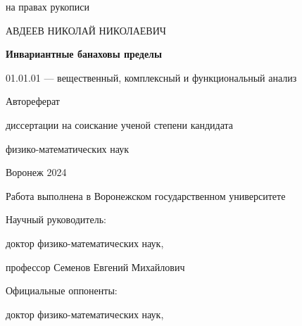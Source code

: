 \documentclass[12pt]{article}
\begin{document}
\large

\thispagestyle{empty}

\begin{flushright}
на правах рукописи
\end{flushright}

\vspace{25mm}

\begin{center}
АВДЕЕВ НИКОЛАЙ НИКОЛАЕВИЧ
\end{center}

\vspace{25mm}

\begin{center}
\textbf{Инвариантные банаховы пределы}
\end{center}

\vspace{10mm}

\begin{center}
01.01.01 --- вещественный, комплексный и функциональный анализ
\end{center}

\vspace{5mm}

\begin{center}
Автореферат

диссертации на соискание ученой степени кандидата

физико-математических наук
\end{center}

\vspace{75mm}

\begin{center}
Воронеж 2024
\end{center}


\newpage
\thispagestyle{empty}

Работа выполнена в Воронежском государственном университете

\vspace{10mm}

Научный руководитель:

\hspace{25mm}доктор физико-математических наук,

\hspace{25mm}профессор Семенов Евгений Михайлович

\vspace{10mm}

Официальные оппоненты:

\hspace{25mm}доктор физико-математических наук,
\end{document}
